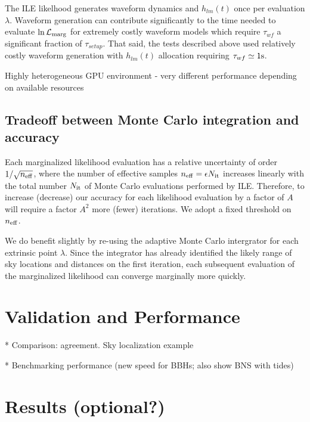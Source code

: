 \documentclass[twocolumn,prd,nofootinbib]{revtex4}
\newcommand\unit[1]{{\rm #1}}
\newcommand\ILE{ILE}
\newcommand\editremark[1]{{\color{red} #1}}
\begin{document}
The \ILE{} likelhood  generates waveform dynamics and $h_{lm}(t)$ once per evaluation $\lambda$.   Waveform generation can contribute significantly to the
time needed to evaluate  $\ln {\cal L}_{\rm marg}$ for extremely costly
waveform models which require $\tau_{wf} $ a significant fraction of $  \tau_{setup}$.   That said, the tests described
above used relatively costly waveform generation with $h_{lm}(t)$ allocation requiring $\tau_{wf} \simeq 1 \unit{s}$.


\editremark{Highly heterogeneous GPU environment - very different performance depending on available resources}

\subsection{Tradeoff between Monte Carlo integration and accuracy}

Each marginalized likelihood evaluation has a relative uncertainty of order  $1/\sqrt{n_{\rm eff}}$, where the number of
effective samples $n_{\rm eff}=\epsilon N_{\rm it}$ increases linearly with the total number $N_{\rm it}$ of Monte Carlo
evaluations performed by \ILE{}.  Therefore, to increase (decrease) our accuracy for each likelihood evaluation by a factor of $A$
will require a factor $A^2$ more (fewer) iterations.   
%
We adopt a fixed threshold on $n_{\rm eff}$.  


We do benefit slightly by re-using the adaptive Monte Carlo intergrator for each extrinsic point $\lambda$.  Since the
integrator has already identified the likely range of sky locations and distances on the first iteration, each
subsequent evaluation of the marginalized likelihood can converge marginally more quickly.



\section{Validation and Performance}
\label{sec:demo}

\begin{figure}

\end{figure}

* Comparison: agreement.  Sky localization example

* Benchmarking performance (new speed for BBHs; also show BNS with tides)


\section{ Results (optional?)}
\end{document}
